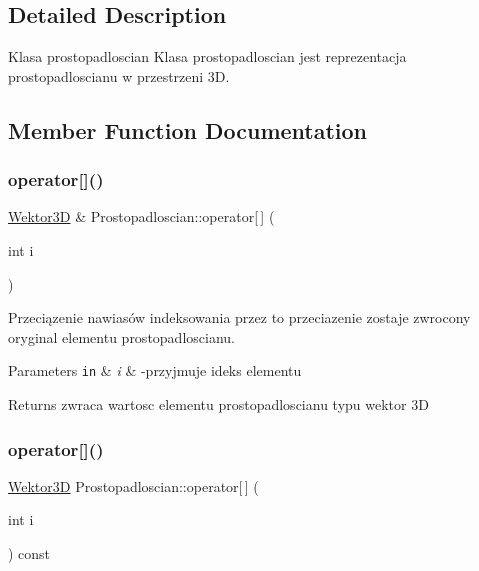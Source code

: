 \subsection{Detailed Description}
Klasa prostopadloscian Klasa prostopadloscian jest reprezentacja prostopadloscianu w przestrzeni 3D. 

\subsection{Member Function Documentation}
\mbox{\label{classProstopadloscian_a91f4a980696e74a98b9a5d3fb62fbabb}} 
\subsubsection{\texorpdfstring{operator[]()}{operator[]()}\hspace{0.1cm}{\footnotesize\ttfamily [1/2]}}
{\footnotesize\ttfamily \hyperlink{classWektor}{Wektor3D} \& Prostopadloscian\+::operator\mbox{[}$\,$\mbox{]} (\begin{DoxyParamCaption}\item[{int}]{i }\end{DoxyParamCaption})}



Przeciązenie nawiasów indeksowania przez to przeciazenie zostaje zwrocony oryginal elementu prostopadloscianu. 


\begin{DoxyParams}[1]{Parameters}
\mbox{\tt in}  & {\em i} & -\/przyjmuje ideks elementu \\
\hline
\end{DoxyParams}
\begin{DoxyReturn}{Returns}
zwraca wartosc elementu prostopadloscianu typu wektor 3D 
\end{DoxyReturn}
\mbox{\label{classProstopadloscian_a94c55b7d1bb2e8fefe105d82cfce5a7e}} 
\subsubsection{\texorpdfstring{operator[]()}{operator[]()}\hspace{0.1cm}{\footnotesize\ttfamily [2/2]}}
{\footnotesize\ttfamily \hyperlink{classWektor}{Wektor3D} Prostopadloscian\+::operator\mbox{[}$\,$\mbox{]} (\begin{DoxyParamCaption}\item[{int}]{i }\end{DoxyParamCaption}) const}



